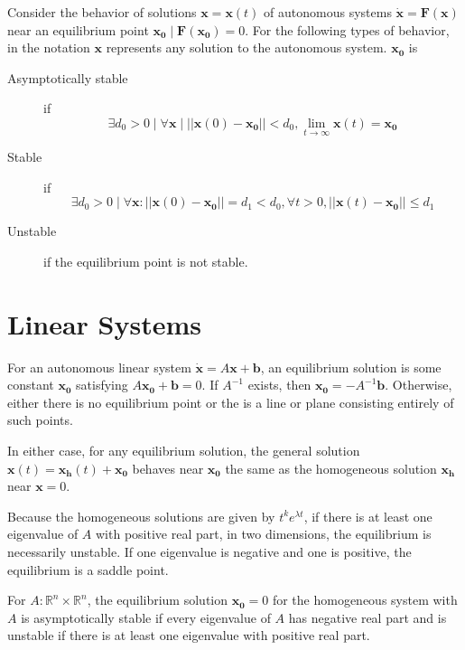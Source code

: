 \documentclass[11pt]{article}
\begin{document}
	Consider the behavior of solutions $\mathbf{x} = \mathbf{x}(t)$ of autonomous systems $\dot{\mathbf{x}} = \mathbf{F}(\mathbf{x})$ near an equilibrium point $\mathbf{x_0} \mid \mathbf{F}(\mathbf{x_0}) = 0$. For the following types of behavior, in the notation $\mathbf{x}$ represents any solution to the autonomous system. $\mathbf{x_0}$ is
	\begin{description}
		\item[Asymptotically stable] if 
		\begin{equation}
			\exists d_0 > 0 \mid \forall \mathbf{x} \mid ||\mathbf{x}(0) - \mathbf{x_0}|| < d_0, \lim_{t\rightarrow \infty} \mathbf{x}(t) = \mathbf{x_0}
		\end{equation} 
		\item[Stable] if
		\begin{equation}
			\exists d_0 > 0 \mid \forall \mathbf{x}: ||\mathbf{x}(0) - \mathbf{x_0}|| = d_1 < d_0, \forall t > 0, ||\mathbf{x}(t) - \mathbf{x_0}|| \leq d_1
		\end{equation}
		\item[Unstable] if the equilibrium point is not stable.
	\end{description}
	
	\section{Linear Systems}
		For an autonomous linear system $\dot{\mathbf{x}} = A\mathbf{x} + \mathbf{b}$, an equilibrium solution is some constant $\mathbf{x_0}$ satisfying $A\mathbf{x_0} + \mathbf{b} = 0$. If $A^{-1}$ exists, then $\mathbf{x_0} = -A^{-1}\mathbf{b}$. Otherwise, either there is no equilibrium point or the is a line or plane consisting entirely of such points. 
	
	In either case, for any equilibrium solution, the general solution $\mathbf{x}(t) = \mathbf{x_h}(t) + \mathbf{x_0}$ behaves near $\mathbf{x_0}$ the same as the homogeneous solution $\mathbf{x_h}$ near $\mathbf{x} = 0$.
	
	Because the homogeneous solutions are given by $t^ke^{\lambda t}$, if there is at least one eigenvalue of $A$ with positive real part, in two dimensions, the equilibrium is necessarily unstable. If one eigenvalue is negative and one is positive, the equilibrium is a saddle point.
	
	For $A: \mathbb{R}^n \times \mathbb{R}^n$, the equilibrium solution $\mathbf{x_0} = 0$ for the homogeneous system with $A$ is asymptotically stable if every eigenvalue of $A$ has negative real part and is unstable if there is at least one eigenvalue with positive real part.
	
\end{document}
